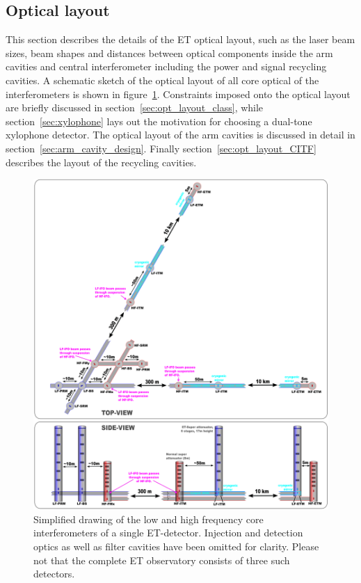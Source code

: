 \FloatBarrier
\subsection{Optical layout}\label{sec:optlayout}

This section describes the details of the ET optical layout, such 
as the laser beam sizes, beam shapes and distances between
optical components inside the arm cavities and central interferometer
including the power and signal recycling cavities. A schematic sketch
of
the optical layout of all core optical of the interferometers is shown
in figure~\ref{Fig:Simple_ETv1}.
Constraints imposed
onto the optical layout are briefly discussed in section~\ref{sec:opt_layout_class}, while 
section~\ref{sec:xylophone} lays out the motivation for choosing a dual-tone xylophone detector.
The optical layout of the arm cavities is discussed in detail in section~\ref{sec:arm_cavity_design}.
Finally section~\ref{sec:opt_layout_CITF} describes the layout of the recycling cavities. 

\begin{figure}[p]
\centering
\includegraphics[width=1\textwidth]{Sec_Optics/ET_April2011_v2.png}
\caption{Simplified drawing of the low and high frequency core interferometers of a single ET-detector. Injection and
detection optics as well as filter cavities have been omitted for clarity. Please not that the complete ET observatory
consists of three such detectors.%
}
\label{Fig:Simple_ETv1}
\end{figure}


